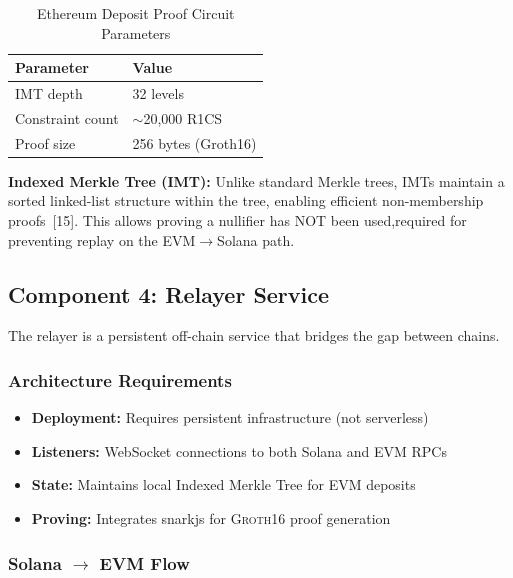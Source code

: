 \documentclass[11pt,a4paper,twoside]{article}
\newcommand{\groth}{\textsc{Groth16}}
\begin{document}
\begin{table}[H]
\centering
\caption{Ethereum Deposit Proof Circuit Parameters}
\label{tab:eth-circuit}
\begin{tabular}{@{}ll@{}}
\toprule
\textbf{Parameter} & \textbf{Value} \\
\midrule
IMT depth & 32 levels \\
Constraint count & $\sim$20,000 R1CS \\
Proof size & 256 bytes (Groth16) \\
\bottomrule
\end{tabular}
\end{table}

\textbf{Indexed Merkle Tree (IMT):} Unlike standard Merkle trees, IMTs maintain a sorted linked-list structure within the tree, enabling efficient non-membership proofs~[15]. This allows proving a nullifier has NOT been used,required for preventing replay on the EVM$\rightarrow$Solana path.

\subsection{Component 4: Relayer Service}

The relayer is a persistent off-chain service that bridges the gap between chains.

\subsubsection{Architecture Requirements}
\begin{itemize}
    \item \textbf{Deployment:} Requires persistent infrastructure (not serverless)
    \item \textbf{Listeners:} WebSocket connections to both Solana and EVM RPCs
    \item \textbf{State:} Maintains local Indexed Merkle Tree for EVM deposits
    \item \textbf{Proving:} Integrates snarkjs for \groth{} proof generation
\end{itemize}

\subsubsection{Solana $\rightarrow$ EVM Flow}
\end{document}

